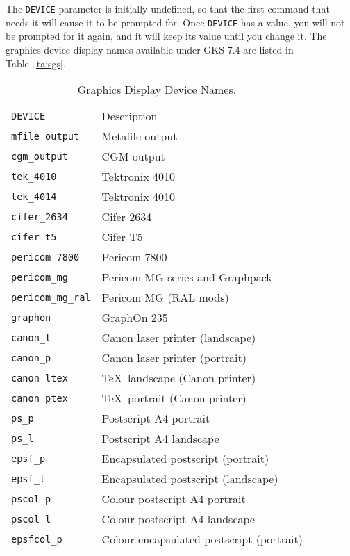 \begin{latexonly}
The \verb+DEVICE+ parameter is initially undefined, so that the first command
that needs it will cause it to be prompted for.  Once \verb+DEVICE+ has a
value, you will not be prompted for it again, and it will keep its value until
you change it.  The graphics device display names available under GKS 7.4 are
listed in Table~\ref{ta:sgs}\@.

\begin{table}
\caption[Graphics Display Devices Names]{Graphics Display Device Names.}
\begin{tabular}{ll}
{\tt DEVICE}           & Description\\
{\tt mfile\_output}    & Metafile output\\
{\tt cgm\_output}      & CGM output\\
{\tt tek\_4010}        & Tektronix 4010\\
{\tt tek\_4014}        & Tektronix 4010\\
{\tt cifer\_2634}      & Cifer 2634\\
{\tt cifer\_t5}        & Cifer T5\\
{\tt pericom\_7800}    & Pericom 7800\\
{\tt pericom\_mg}      & Pericom MG series and Graphpack\\
{\tt pericom\_mg\_ral} & Pericom MG (RAL mods)\\
{\tt graphon}          & GraphOn 235\\
{\tt canon\_l}         & Canon laser printer (landscape)\\
{\tt canon\_p}         & Canon laser printer (portrait)\\
{\tt canon\_ltex}      & \TeX\ landscape (Canon printer)\\
{\tt canon\_ptex}      & \TeX\ portrait (Canon printer)\\
{\tt ps\_p}            & Postscript A4 portrait\\
{\tt ps\_l}            & Postscript A4 landscape\\
{\tt epsf\_p}          & Encapsulated postscript (portrait)\\
{\tt epsf\_l}          & Encapsulated postscript (landscape)\\
{\tt pscol\_p}         & Colour postscript A4 portrait\\
{\tt pscol\_l}         & Colour postscript A4 landscape\\
{\tt epsfcol\_p}       & Colour encapsulated postscript (portrait)\\

\end{tabular}
\end{table}
\end{latexonly}
